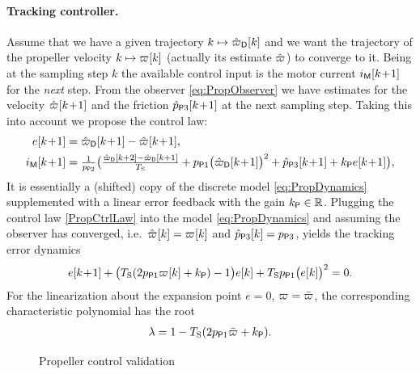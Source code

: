\paragraph*{Tracking controller.}
Assume that we have a given trajectory $k \mapsto \PropVelDF[][k]$ and we want the trajectory of the propeller velocity $k \mapsto \PropVel[][k]$ (actually its estimate $\PropVelObs$) to converge to it.
Being at the sampling step $k$ the available control input is the motor current $\BLDCCurr[][k\!+\!1]$ for the \textit{next} step.
From the observer \eqref{eq:PropObserver} we have estimates for the velocity $\PropVelObs[][k\!+\!1]$ and the friction $\PropParamObs[3][k\!+\!1]$ at the next sampling step.
Taking this into account we propose the control law:
\begin{subequations}\label{PropCtrlLaw}
\begin{align}
 e[k\!+\!1] &= \PropVelDF[][k\!+\!1] - \PropVelObs[][k\!+\!1],
\\
 \BLDCCurr[][k\!+\!1] &= \tfrac{1}{\PropParam[2]} \big( \tfrac{\PropVelDF[][k+2] - \PropVelDF[][k+1]}{\Ts} + \PropParam[1] \big( \PropVelDF[][k\!+\!1] \big)^2 + \PropParamObs[3][k\!+\!1] + \PropCtrlGain e[k\!+\!1] \big),
\end{align}
\end{subequations}
It is essentially a (shifted) copy of the discrete model \eqref{eq:PropDynamics} supplemented with a linear error feedback with the gain $\PropCtrlGain \in \RealNum$.
Plugging the control law \eqref{PropCtrlLaw} into the model \eqref{eq:PropDynamics} and assuming the observer has converged, i.e.\ $\PropVelObs[][k] = \PropVel[][k]$ and $\PropParamObs[3][k] = \PropParam[3]$, yields the tracking error dynamics
\begin{align}
 e[k\!+\!1] + \big( \Ts (2 \PropParam[1] \PropVel[][k] + \PropCtrlGain) - 1 \big) e[k] + \Ts \PropParam[1] \big( e[k] \big)^2 = 0.
\end{align}
For the linearization about the expansion point $e = 0$, $\PropVel = \PropVelStat$, the corresponding characteristic polynomial has the root
\begin{align}
 \lambda = 1 - \Ts (2 \PropParam[1] \PropVelStat + \PropCtrlGain).
\end{align}


\begin{figure}
 \centering
 \footnotesize
 
 \caption{Propeller control validation}
 \label{fig:PropCtrlRes}
\end{figure}

